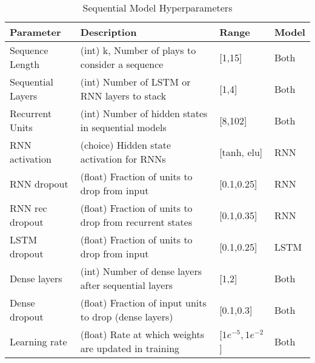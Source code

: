\documentclass[11pt]{article}
\begin{document}
                    \begin{table*}[ht]
                    \caption{Sequential Model Hyperparameters} \label{tab:Sequential Model Hyperparameters} 
                    \centering
                    \begin{tabular}{|| m{3cm} | m{8.75cm}| m{2cm} | m{1.25cm} |}
                        \hline
                        \textbf{Parameter} & \textbf{Description} & \textbf{Range} & \textbf{Model} \\
                        \hline\hline
                        Sequence Length & (int) k, Number of plays to consider a sequence & [1,15] & Both \\
                        \hline
                        Sequential Layers & (int) Number of LSTM or RNN layers to stack & [1,4] & Both \\
                        \hline
                        Recurrent Units & (int) Number of hidden states in sequential models & [8,102] & Both \\
                        \hline
                        RNN activation & (choice) Hidden state activation for RNNs & [tanh, elu] & RNN \\
                        \hline
                        RNN dropout & (float) Fraction of units to drop from input & [0.1,0.25] & RNN \\
                        \hline
                        RNN rec dropout & (float) Fraction of units to drop from recurrent states & [0.1,0.35] & RNN \\
                        \hline
                        LSTM dropout & (float) Fraction of units to drop from input & [0.1,0.25] & LSTM \\
                        \hline
                        Dense layers & (int) Number of dense layers after sequential layers & [1,2] & Both \\
                        \hline
                        Dense dropout & (float) Fraction of input units to drop (dense layers) & [0.1,0.3] & Both \\
                        \hline
                        Learning rate & (float) Rate at which weights are updated in training & [$1e^{-5},1e^{-2}$] & Both \\
                        \hline
                    \end{tabular}
                    \end{table*}
\end{document}
